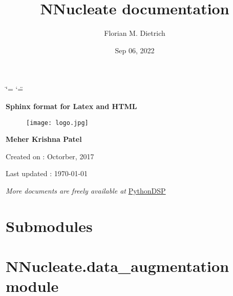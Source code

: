 \documentclass[a4paper,10pt,english]{report}
\title{NNucleate documentation}
\date{Sep 06, 2022}
\author{Florian M. Dietrich}
\begin{document}
\ifdefined\shorthandoff
  \ifnum\catcode`\=\string=\active\shorthandoff{=}\fi
  \ifnum\catcode`\"=\active{}\fi
\fi

\pagestyle{empty}


        \begin{titlepage}
            \centering

            \vspace*{40mm} %
            \textbf{\Huge {Sphinx format for Latex and HTML}}

            \vspace{0mm}
            \begin{figure}[!h]
                \centering
                \texttt{[image: logo.jpg]}
            \end{figure}

            \vspace{0mm}
            \Large \textbf{{Meher Krishna Patel}}

            \small Created on : Octorber, 2017

            \vspace*{0mm}
            \small  Last updated : \MonthYearFormat\today


            \vfill
            \small \textit{More documents are freely available at }{\href{http://pythondsp.readthedocs.io/en/latest/pythondsp/toc.html}{PythonDSP}}
        \end{titlepage}

        \clearpage
        \tableofcontents
        \listoffigures
        \listoftables
        \clearpage

        
\pagestyle{plain}
 
\pagestyle{normal}
\label{\detokenize{NNucleate::doc}}



\chapter{Submodules}
\label{\detokenize{NNucleate:submodules}}

\chapter{NNucleate.data\_augmentation module}
\label{\detokenize{NNucleate:module-NNucleate.data_augmentation}}\label{\detokenize{NNucleate:nnucleate-data-augmentation-module}}
\end{document}
